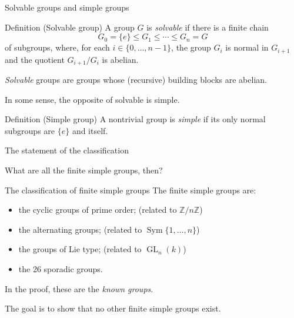 \documentclass{beamer}
\DeclareMathOperator{\GL}{GL}
\DeclareMathOperator{\Sym}{Sym}
\begin{document}
\begin{frame}{Solvable groups and simple groups}

\begin{block}{Definition (Solvable group)}
A group $G$ is \emph{solvable} if there is a finite chain
\[
  G_0 = \{e\} \le G_1 \le \cdots \le G_n = G
\]
of subgroups, where, for each $i \in \{0, \ldots , n - 1\}$, the group $G_i$ is normal in $G_{i+1}$ and the quotient $G_{i+1}/G_i$ is abelian.
\end{block}

{\emph{Solvable}} groups are groups whose (recursive) building blocks are abelian.

\bigskip

In some sense, the opposite of solvable is simple.

\bigskip

\begin{block}{Definition (Simple group)}
  A nontrivial group is {\emph{simple}} if its only normal subgroups are $\{e\}$ and itself.
\end{block}

\end{frame}

\begin{frame}{The statement of the classification}

What are all the finite simple groups, then?

\bigskip

\begin{block}{The classification of finite simple groups}
The finite simple groups are:

\medskip

\begin{itemize}
  \item the cyclic groups of prime order; \hfill (related to $\mathbb{Z}/n\mathbb{Z}$)
  \item the alternating groups; \hfill (related to $\Sym \{1, \ldots , n\}$)
  \item the groups of Lie type; \hfill (related to $\GL_n(k)$)
  \item the 26 sporadic groups. %
\end{itemize}
\end{block}

In the proof, these are the \emph{known groups}.


\bigskip

The goal is to show that no other finite simple groups exist.
\end{frame}
\end{document}
